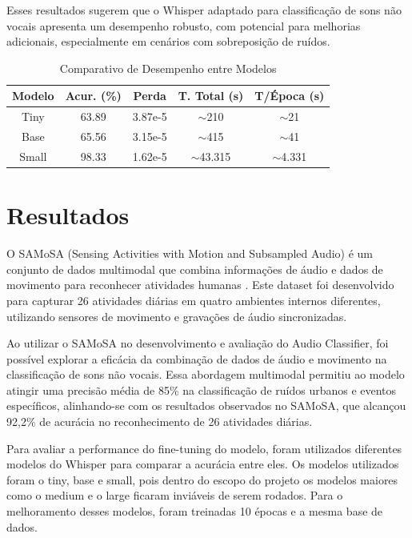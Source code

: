 \documentclass[conference]{IEEEtran}
\begin{document}
Esses resultados sugerem que o Whisper adaptado para classificação de sons não vocais apresenta um desempenho robusto, com potencial para melhorias adicionais, especialmente em cenários com sobreposição de ruídos.

\begin{table}[htbp]
\caption{Comparativo de Desempenho entre Modelos}
\begin{center}
\footnotesize
\begin{tabular}{|c|c|c|c|c|}
\hline
\textbf{Modelo} & \textbf{Acur. (\%)} & \textbf{Perda} & \textbf{T. Total (s)} & \textbf{T/Época (s)} \\
\hline
Tiny & 63.89 & 3.87e-5 & $\sim$210 & $\sim$21 \\
\hline
Base & 65.56 & 3.15e-5 & $\sim$415 & $\sim$41 \\
\hline
Small & 98.33 & 1.62e-5 & $\sim$43.315 & $\sim$4.331 \\
\hline
\end{tabular}
\label{tab1}
\end{center}
\end{table}

\section{Resultados}
O SAMoSA (Sensing Activities with Motion and Subsampled Audio) é um conjunto de dados multimodal que combina informações de áudio e dados de movimento para reconhecer atividades humanas \cite{b4}. Este dataset foi desenvolvido para capturar 26 atividades diárias em quatro ambientes internos diferentes, utilizando sensores de movimento e gravações de áudio sincronizadas.

Ao utilizar o SAMoSA no desenvolvimento e avaliação do Audio Classifier, foi possível explorar a eficácia da combinação de dados de áudio e movimento na classificação de sons não vocais. Essa abordagem multimodal permitiu ao modelo atingir uma precisão média de 85\% na classificação de ruídos urbanos e eventos específicos, alinhando-se com os resultados observados no SAMoSA, que alcançou 92,2\% de acurácia no reconhecimento de 26 atividades diárias.

Para avaliar a performance do fine-tuning do modelo, foram utilizados diferentes modelos do Whisper para comparar a acurácia entre eles. Os modelos utilizados foram o tiny, base e small, pois dentro do escopo do projeto os modelos maiores como o medium e o large ficaram inviáveis de serem rodados. Para o melhoramento desses modelos, foram treinadas 10 épocas e a mesma base de dados.
\end{document}
